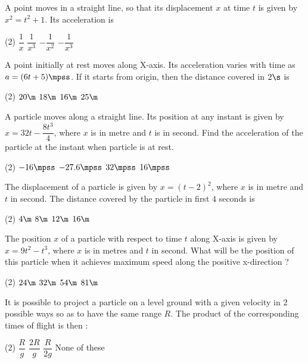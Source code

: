 
\item A point moves in a straight line, so that its displacement $x$ at time $t$ is given by $x^2=t^2+1$. Its acceleration is
\begin{tasks}(2)
    \task $\dfrac{1}{x}$
    \task $\dfrac{1}{x^3}$\ans
    \task $-\dfrac{1}{x^2}$
    \task $-\dfrac{1}{x^3}$
\end{tasks}

\item A point initially at rest moves along X-axis. Its acceleration varies with time as $a=(6t+5)\mpss$. If it starts from origin, then the distance covered in $2\s$ is
\begin{tasks}(2)
    \task $20\m$
    \task $18\m$\ans
    \task $16\m$
    \task $25\m$
\end{tasks}

\item A particle moves along a straight line. Its position at any instant is given by $x=32t-\dfrac{8t^3}{4}$, where $x$ is in metre and $t$ is in second. Find the acceleration of the particle at the instant when particle is at rest.
\begin{tasks}(2)
    \task $-16\mpss$
    \task $-27.6\mpss$\ans
    \task $32\mpss$
    \task $16\mpss$
\end{tasks}

\item The displacement of a particle is given by $x=(t-2)^2$, where $x$ is in metre and $t$ in second. The distance covered by the particle in first $4$ seconds is
\begin{tasks}(2)
    \task $4\m$
    \task $8\m$\ans
    \task $12\m$
    \task $16\m$
\end{tasks}

\item The position $x$ of a particle with respect to time $t$ along X-axis is given by $x=9t^2-t^3$, where $x$ is in metres and $t$ in second. What will be the position of this particle when it achieves maximum speed along the positive x-direction ?
\begin{tasks}(2)
    \task $24\m$
    \task $32\m$
    \task $54\m$\ans
    \task $81\m$
\end{tasks}

\item It is possible to project a particle on a level ground with a given velocity in 2 possible ways so as to have the same range $R$. The product of the corresponding times of flight is then :
\begin{tasks}(2)
\task $\dfrac{R}{g}$
\task $\dfrac{2R}{g}$\ans
\task $\dfrac{R}{2g}$
\task None of these
\end{tasks}